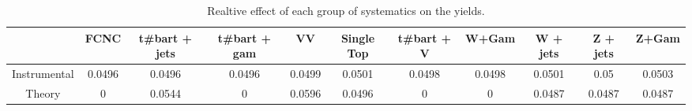 \begin{table}[htbp]
\begin{center}
\begin{tabular}{|c|c|c|c|c|c|c|c|c|c|c|}
\hline 
      & FCNC      & t#bar{t} + jets      & t#bar{t} +  gam      & VV      & Single Top      & t#bar{t} + V      & W+Gam      & W + jets      & Z + jets      & Z+Gam \\ 
\hline 
 Instrumental & 0.0496 & 0.0496 & 0.0496 & 0.0499 & 0.0501 & 0.0498 & 0.0498 & 0.0501 & 0.05 & 0.0503 \\ 
 Theory & 0 & 0.0544 & 0 & 0.0596 & 0.0496 & 0 & 0 & 0.0487 & 0.0487 & 0.0487 \\ 
\hline 
\end{tabular} 
\caption{Realtive effect of each group of systematics on the yields.} 
\end{center} 
\end{table} 
